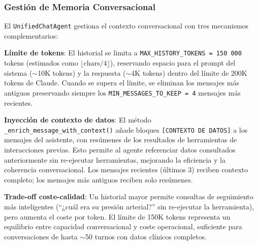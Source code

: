 \subsubsection{Gestión de Memoria Conversacional}
\label{sec:memoria}

El \texttt{UnifiedChatAgent} gestiona el contexto conversacional con tres mecanismos complementarios:

\textbf{Límite de tokens}: El historial se limita a \texttt{MAX\_HISTORY\_TOKENS = 150\,000} tokens (estimados como $\lfloor\text{chars}/4\rfloor$), reservando espacio para el prompt del sistema ($\sim$10K tokens) y la respuesta ($\sim$4K tokens) dentro del límite de 200K tokens de Claude. Cuando se supera el límite, se eliminan los mensajes más antiguos preservando siempre los \texttt{MIN\_MESSAGES\_TO\_KEEP = 4} mensajes más recientes.

\textbf{Inyección de contexto de datos}: El método \texttt{\_enrich\_message\_with\_context()} añade bloques \texttt{[CONTEXTO DE DATOS]} a los mensajes del asistente, con resúmenes de los resultados de herramientas de interacciones previas. Esto permite al agente referenciar datos consultados anteriormente sin re-ejecutar herramientas, mejorando la eficiencia y la coherencia conversacional. Los mensajes recientes (últimos 3) reciben contexto completo; los mensajes más antiguos reciben solo resúmenes.

\textbf{Trade-off coste-calidad}: Un historial mayor permite consultas de seguimiento más inteligentes (``¿cuál era su presión arterial?'' sin re-ejecutar la herramienta), pero aumenta el coste por token. El límite de 150K tokens representa un equilibrio entre capacidad conversacional y coste operacional, suficiente para conversaciones de hasta $\sim$50 turnos con datos clínicos completos.


